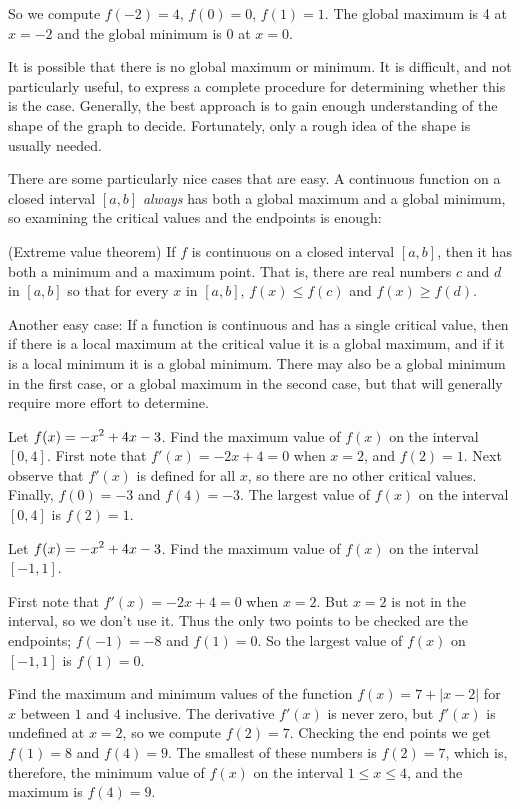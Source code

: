 So we compute $f(-2)=4$, $f(0)=0$, $f(1)=1$. The global maximum is 4
at $x=-2$ and the global minimum is 0 at $x=0$.
\endexample

It is possible that there is no global maximum or minimum. It is
difficult, and not particularly useful, to express a complete procedure for
determining whether this is the case. Generally, the best approach is
to gain enough understanding of the shape of the graph to
decide. Fortunately, only a rough idea of the shape is usually needed.

There are some particularly nice cases that are easy. A
continuous function on a closed interval $[a,b]$ {\em
  always\/} has both a global maximum and a global minimum, so examining
the critical values and the endpoints is enough:

\thm (Extreme value theorem) 
If $f$ is continuous on a closed interval
$[a,b]$, then it has both a minimum and a maximum point. That is,
there are real numbers $c$ and $d$ in $[a,b]$ so that 
for every $x$ in $[a,b]$, $f(x)\le f(c)$ and $f(x)\ge f(d)$.
\endthmnoproof
{}

Another easy case: If a function is
continuous and has a single critical value, then if there is a local
maximum at the critical value it is a global maximum, and if it is a
local minimum it is a global minimum. There may also be a global
minimum in the first case, or a global maximum in the second case, but
that will generally require more effort to determine.

\example
 Let $\displaystyle f(x)=-x^2+4x-3$. 
Find the maximum value of $f(x)$ on the interval $[0,4]$.
First note that $f'(x)= -2 x +4=0$ when $x=2$, and $f(2)= 1$.
Next observe that $f'(x)$ is defined for all $x$, so there are no
other critical values.
Finally, $f(0) = -3$ and $f(4)= -3$. The largest value of
$f(x)$ on the interval $[0,4]$ is $f(2)=1$.
\endexample

\example
Let $\displaystyle f(x)=-x^2+4x-3$. Find the maximum value of $f(x)$ on the interval
$[-1,1]$.

First note that $f'(x)= -2 x +4=0$ when $x=2$. But $x=2$ is not in the
interval, so we don't use it.
Thus the only two points to be checked are the endpoints;
$f(-1) = -8$ and $f(1)= 0$. So the largest value of
$f(x)$ on $[-1,1]$ is $f(1)=0$.
\endexample

\example
Find the maximum and minimum values of the function $f(x)= 7+|x-2|$ for
$x$ between $1$ and $4$ inclusive.
The derivative $f'(x)$ is never zero, but $f'(x)$ is undefined at $x=2$,
so we compute $f(2)= 7$. Checking the end points we get $f(1)=8$ and
$f(4)=9$. The smallest of these numbers is $f(2)=7$, which is, therefore,
the minimum value of $f(x)$ on the interval $1 \le x \le 4$, and the
maximum is $f(4)=9$.
\endexample

